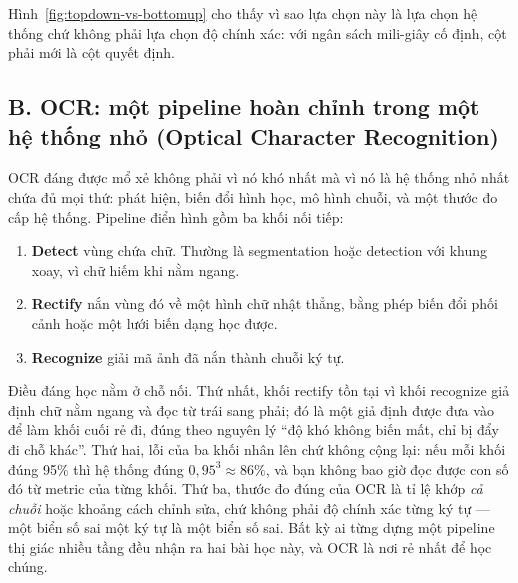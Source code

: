 \documentclass[../../../deep_learning.tex]{subfiles}
\begin{document}
Hình~\ref{fig:topdown-vs-bottomup} cho thấy vì sao lựa chọn này là lựa chọn hệ thống chứ không phải lựa chọn độ chính xác: với ngân sách mili-giây cố định, cột phải mới là cột quyết định.

\subsection{B. OCR: một pipeline hoàn chỉnh trong một hệ thống nhỏ (Optical Character Recognition)}
OCR đáng được mổ xẻ không phải vì nó khó nhất mà vì nó là hệ thống nhỏ nhất chứa đủ mọi thứ: phát hiện, biến đổi hình học, mô hình chuỗi, và một thước đo cấp hệ thống. Pipeline điển hình gồm ba khối nối tiếp:

\begin{enumerate}
\item \textbf{Detect} vùng chứa chữ. Thường là segmentation hoặc detection với khung xoay, vì chữ hiếm khi nằm ngang.
\item \textbf{Rectify} nắn vùng đó về một hình chữ nhật thẳng, bằng phép biến đổi phối cảnh hoặc một lưới biến dạng học được.
\item \textbf{Recognize} giải mã ảnh đã nắn thành chuỗi ký tự.
\end{enumerate}

Điều đáng học nằm ở chỗ nối. Thứ nhất, khối rectify tồn tại vì khối recognize giả định chữ nằm ngang và đọc từ trái sang phải; đó là một giả định được đưa vào để làm khối cuối rẻ đi, đúng theo nguyên lý ``độ khó không biến mất, chỉ bị đẩy đi chỗ khác''. Thứ hai, lỗi của ba khối nhân lên chứ không cộng lại: nếu mỗi khối đúng 95\% thì hệ thống đúng \(0{,}95^3 \approx 86\%\), và bạn không bao giờ đọc được con số đó từ metric của từng khối. Thứ ba, thước đo đúng của OCR là tỉ lệ khớp \emph{cả chuỗi} hoặc khoảng cách chỉnh sửa, chứ không phải độ chính xác từng ký tự --- một biển số sai một ký tự là một biển số sai. Bất kỳ ai từng dựng một pipeline thị giác nhiều tầng đều nhận ra hai bài học này, và OCR là nơi rẻ nhất để học chúng.
\end{document}

